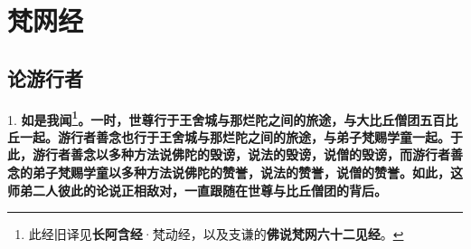 \chapter{梵网经}

\section{论游行者}

{\Large 1.} \textbf{如是我闻\footnote{此经旧译见\textbf{长阿含经}·梵动经，以及支谦的\textbf{佛说梵网六十二见经}。}。一时，世尊行于王舍城与那烂陀之间的旅途，与大比丘僧团五百比丘一起。游行者善念也行于王舍城与那烂陀之间的旅途，与弟子梵赐学童一起。于此，游行者善念以多种方法说佛陀的毁谤，说法的毁谤，说僧的毁谤，而游行者善念的弟子梵赐学童以多种方法说佛陀的赞誉，说法的赞誉，说僧的赞誉。如此，这师弟二人彼此的论说正相敌对，一直跟随在世尊与比丘僧团的背后。}

